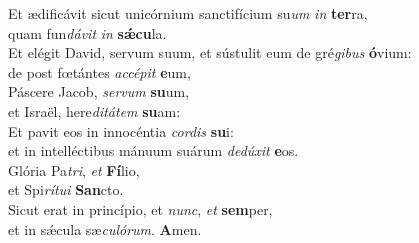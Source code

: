 \oddverse Et ædificávit sicut unicórnium sanctifícium su\textit{um} \textit{in} \textbf{ter}ra,~\*\\
\oddverse quam fun\textit{dá}\textit{vit} \textit{in} \textbf{sǽ}\textbf{cu}la.\\
\evenverse Et elégit David, servum suum, et sústulit eum de gré\textit{gi}\textit{bus} \textbf{ó}vium:~\*\\
\evenverse de post fœtántes \textit{ac}\textit{cé}\textit{pit} \textbf{e}um,\\
\oddverse Páscere Jacob, \textit{ser}\textit{vum} \textbf{su}um,~\*\\
\oddverse et Israël, here\textit{di}\textit{tá}\textit{tem} \textbf{su}am:\\
\evenverse Et pavit eos in innocéntia \textit{cor}\textit{dis} \textbf{su}i:~\*\\
\evenverse et in intelléctibus mánuum suárum \textit{de}\textit{dú}\textit{xit} \textbf{e}os.\\
\oddverse Glória Pa\textit{tri}, \textit{et} \textbf{Fí}lio,~\*\\
\oddverse et Spi\textit{rí}\textit{tu}\textit{i} \textbf{San}cto.\\
\evenverse Sicut erat in princípio, et \textit{nunc}, \textit{et} \textbf{sem}per,~\*\\
\evenverse et in sǽcula sæ\textit{cu}\textit{ló}\textit{rum}. \textbf{A}men.\\
